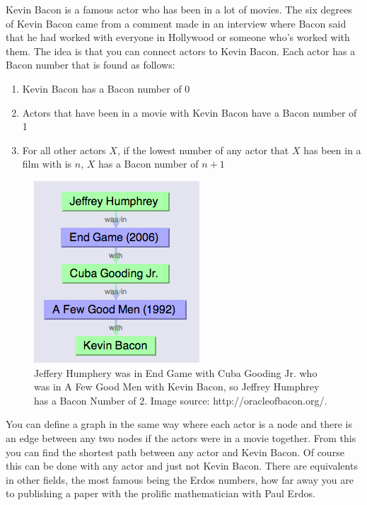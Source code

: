 Kevin Bacon is a famous actor who has been in a lot of movies. The six degrees of Kevin Bacon came from a comment made in an interview where Bacon said that he had worked with everyone in Hollywood or someone who's worked with them.  The idea is that you can connect actors to Kevin Bacon. Each actor has a Bacon number that is found as follows:
\begin{enumerate}
\item Kevin Bacon has a Bacon number of 0
\item Actors that have been in a movie with Kevin Bacon have a Bacon number of 1
\item For all other actors $X$, if the lowest number of any actor that $X$ has been in a film with is $n$, $X$ has a Bacon number of $n+1$
\end{enumerate}

\begin{figure}[h]
\includegraphics[scale = .6]{Example}
\caption{Jeffery Humphery was in End Game with Cuba Gooding Jr. who was in A Few Good Men with Kevin Bacon, so Jeffrey Humphrey has a Bacon Number of 2.  Image source: http://oracleofbacon.org/.}
\end{figure}

You can define a graph in the same way where each actor is a node and there is an edge between any two nodes if the actors were in a movie together. From this you can find the shortest path between any actor and Kevin Bacon. Of course this can be done with any actor and just not Kevin Bacon. There are equivalents in other fields, the most famous being the Erdos numbers, how far away you are to publishing a paper with the prolific mathematician with Paul Erdos.


